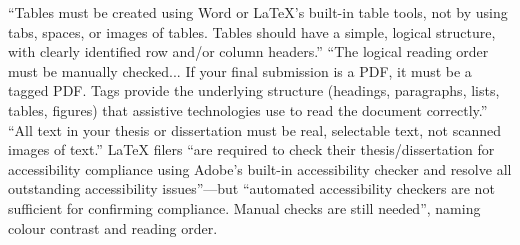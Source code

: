 	{``Tables must be created using Word or \LaTeX's built-in table tools, not
	 by using tabs, spaces, or images of tables. Tables should have a simple,
	 logical structure, with clearly identified row and/or column headers.''}
	{``The logical reading order must be manually checked... If your final
	 submission is a PDF, it must be a tagged PDF. Tags provide the underlying
	 structure (headings, paragraphs, lists, tables, figures) that assistive
	 technologies use to read the document correctly.''}
	{``All text in your thesis or dissertation must be real, selectable text,
	 not scanned images of text.''}
	{\LaTeX{} filers ``are required to check their thesis/dissertation for
	 accessibility compliance using Adobe's built-in accessibility checker and
	 resolve all outstanding accessibility issues''---but ``automated
	 accessibility checkers are not sufficient for confirming compliance. Manual
	 checks are still needed'', naming colour contrast and reading order.}

\newcommand{\purdue@campus}{West Lafayette}
\newcommand{\purduecampus}[1]{\renewcommand{\purdue@campus}{#1}}
\newcommand{\purdue@formhead}{}
\newcommand{\purdueformhead}[1]{\renewcommand{\purdue@formhead}{#1}}

